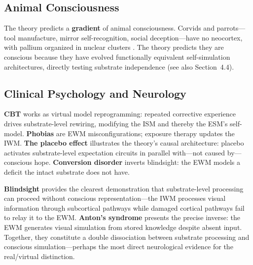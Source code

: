 \documentclass[12pt]{article}
\begin{document}
\subsection{Animal Consciousness}

The theory predicts a \textbf{gradient} of animal consciousness. Corvids and parrots---\hspace{0pt}tool manufacture, mirror self-recognition, social deception---\hspace{0pt}have no neocortex, with pallium organized in nuclear clusters \citep{Gunturkun2016}. The theory predicts they are conscious because they have evolved functionally equivalent self-simulation architectures, directly testing substrate independence (see also Section~4.4).


\subsection{Clinical Psychology and Neurology}

\textbf{CBT} works as virtual model reprogramming: repeated corrective experience drives substrate-level rewiring, modifying the ISM and thereby the ESM's self-model. \textbf{Phobias} are EWM misconfigurations; exposure therapy updates the IWM. \textbf{The placebo effect} illustrates the theory's causal architecture: placebo activates substrate-level expectation circuits in parallel with---\hspace{0pt}not caused by---\hspace{0pt}conscious hope. \textbf{Conversion disorder} inverts blindsight: the EWM models a deficit the intact substrate does not have.

\textbf{Blindsight} \citep{Weiskrantz1986} provides the clearest demonstration that substrate-level processing can proceed without conscious representation---\hspace{0pt}the IWM processes visual information through subcortical pathways while damaged cortical pathways fail to relay it to the EWM. \textbf{Anton's syndrome} \citep{Anton1899,Aldrich1987} presents the precise inverse: the EWM generates visual simulation from stored knowledge despite absent input. Together, they constitute a double dissociation between substrate processing and conscious simulation---\hspace{0pt}perhaps the most direct neurological evidence for the real/virtual distinction.



\end{document}
